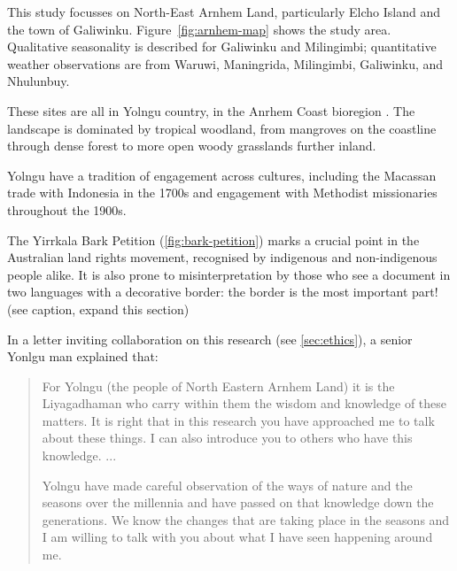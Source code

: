 This study focusses on North-East Arnhem Land, particularly Elcho Island
and the town of Galiwinku.  Figure~\ref{fig:arnhem-map} shows the study area.
Qualitative seasonality is described for Galiwinku and Milingimbi;
quantitative weather observations are from Waruwi, Maningrida, Milingimbi,
Galiwinku, and Nhulunbuy.

These sites are all in Yolngu country, in the Anrhem Coast bioregion \citep{ens2014}.
The landscape is dominated by tropical woodland, from mangroves on the coastline 
through dense forest to more open woody grasslands further inland.

Yolngu have a tradition of engagement across cultures, including
the Macassan trade with Indonesia in the 1700s and engagement with Methodist
missionaries throughout the 1900s.

The Yirrkala Bark Petition (\autoref{fig:bark-petition}) marks a crucial
point in the Australian land rights movement, recognised by indigenous and
non-indigenous people alike.  It is also prone to misinterpretation by those
who see a document in two languages with a decorative border: the border
is the most important part!  (see caption, expand this section)




In a letter inviting collaboration on this research (see \autoref{sec:ethics}),
a senior Yonlgu man explained that:

\blockquote{
    For Yolngu (the people of North Eastern Arnhem Land) it is the Liyagadhaman
    who carry within them the wisdom and knowledge of these matters.
    It is right that in this research you have approached me to talk about these
    things. I can also introduce you to others who have this knowledge.  ...

    Yolngu have made careful observation of the ways of nature and the seasons
    over the millennia and have passed on that knowledge down the generations.
    We know the changes that are taking place in the seasons and I am willing
    to talk with you about what I have seen happening around me.
}




